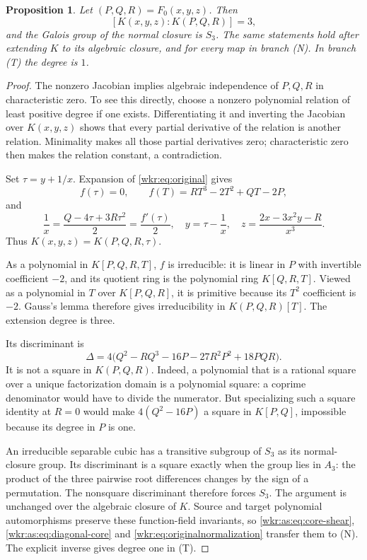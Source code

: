 \documentclass[11pt,a4paper]{article}
\numberwithin{equation}{section}
\newtheorem{proposition}[theorem]{Proposition}
\theoremstyle{definition}
\theoremstyle{remark}
\begin{document}
\begin{proposition}\label{wkr:as:prop:cubic}
Let $(P,Q,R)=F_0(x,y,z)$. Then
\[
[K(x,y,z):K(P,Q,R)]=3,
\]
and the Galois group of the normal closure is $S_3$. The same statements
hold after extending $K$ to its algebraic closure, and for every map in
branch \textup{(N)}. In branch \textup{(T)} the degree is $1$.
\end{proposition}
\begin{proof}
The nonzero Jacobian implies algebraic independence of $P,Q,R$ in
characteristic zero. To see this directly, choose a nonzero polynomial
relation of least positive degree if one exists. Differentiating it and
inverting the Jacobian over $K(x,y,z)$ shows that every partial
derivative of the relation is another relation. Minimality makes all
those partial derivatives zero; characteristic zero then makes the
relation constant, a contradiction.

Set $\tau=y+1/x$. Expansion of \eqref{wkr:eq:original} gives
\begin{equation}\label{wkr:as:eq:cubic}
f(\tau)=0,\qquad f(T)=RT^3-2T^2+QT-2P,
\end{equation}
and
\begin{equation}\label{wkr:as:eq:cubic-inverse}
\frac1x=\frac{Q-4\tau+3R\tau^2}{2}=\frac{f'(\tau)}2,
\quad y=\tau-\frac1x,
\quad z=\frac{2x-3x^2y-R}{x^3}.
\end{equation}
Thus $K(x,y,z)=K(P,Q,R,\tau)$.

As a polynomial in $K[P,Q,R,T]$, $f$ is irreducible: it is linear in $P$
with invertible coefficient $-2$, and its quotient ring is the polynomial
ring $K[Q,R,T]$. Viewed as a polynomial in $T$ over $K[P,Q,R]$, it is
primitive because its $T^2$ coefficient is $-2$. Gauss's lemma therefore
gives irreducibility in $K(P,Q,R)[T]$. The extension degree is three.

Its discriminant is
\begin{equation}\label{wkr:as:eq:discriminant}
\Delta=4\bigl(Q^2-RQ^3-16P-27R^2P^2+18PQR\bigr).
\end{equation}
It is not a square in $K(P,Q,R)$. Indeed, a polynomial that is a rational
square over a unique factorization domain is a polynomial square: a
coprime denominator would have to divide the numerator. But specializing
such a square identity at $R=0$ would make $4(Q^2-16P)$ a square in
$K[P,Q]$, impossible because its degree in $P$ is one.

An irreducible separable cubic has a transitive subgroup of $S_3$ as its
normal-closure group. Its discriminant is a square exactly when the group
lies in $A_3$: the product of the three pairwise root differences changes
by the sign of a permutation. The nonsquare discriminant therefore forces
$S_3$. The argument is unchanged over the algebraic closure of $K$.
Source and target polynomial automorphisms preserve these function-field
invariants, so \eqref{wkr:as:eq:core-shear},
\eqref{wkr:as:eq:diagonal-core} and \eqref{wkr:eq:originalnormalization}
transfer them to (N). The explicit inverse gives degree one in (T).
\end{proof}
\end{document}

